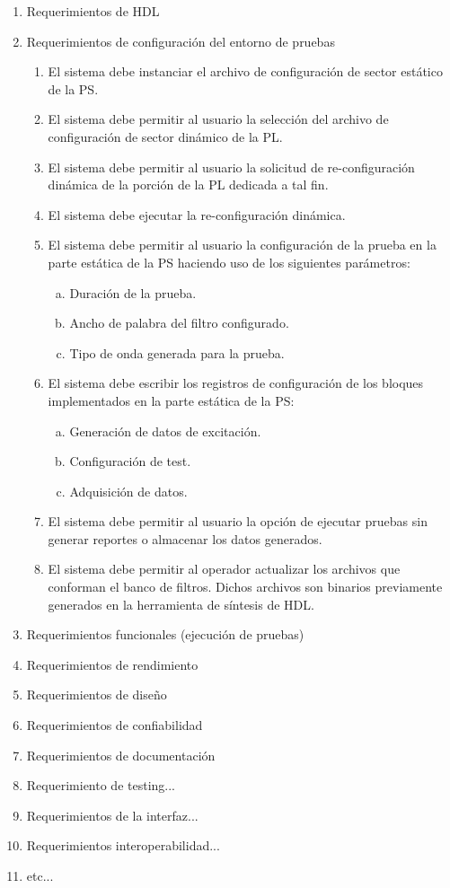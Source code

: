 \documentclass[
11pt, %
]{charter}
\begin{document}
\begin{enumerate}
	\item Requerimientos de HDL
	
	\item Requerimientos de configuración del entorno de pruebas
	\begin{enumerate}
		\item El sistema debe instanciar el archivo de configuración de sector estático de la PS.
		\item El sistema debe permitir al usuario la selección del archivo de configuración de sector dinámico de la PL.
		\item El sistema debe permitir al usuario la solicitud de re-configuración dinámica de la porción de la PL dedicada a tal fin.
		\item El sistema debe ejecutar la re-configuración dinámica.
		\item El sistema debe permitir al usuario la configuración de la prueba en la parte estática de la PS haciendo uso de los siguientes parámetros:
		\begin{enumerate}[a.]
			\item Duración de la prueba.
			\item Ancho de palabra del filtro configurado.
			\item Tipo de onda generada para la prueba.
		\end{enumerate}
		\item El sistema debe escribir los registros de configuración de los bloques implementados en la parte estática de la PS:
		 \begin{enumerate}[a.]
			\item Generación de datos de excitación.
			\item Configuración de test.
			\item Adquisición de datos.
		\end{enumerate}
		\item El sistema debe permitir al usuario la opción de ejecutar pruebas sin generar reportes o almacenar los datos generados. 
		\item El sistema debe permitir al operador actualizar los archivos que conforman el banco de filtros. Dichos archivos son binarios previamente generados en la herramienta de síntesis de HDL.	
	\end{enumerate}
	
	
	\item Requerimientos funcionales (ejecución de pruebas)
	\item Requerimientos de rendimiento
	\item Requerimientos de diseño
	\item Requerimientos de confiabilidad 
	
	\item Requerimientos de documentación
	\item Requerimiento de testing...
	\item Requerimientos de la interfaz...
	\item Requerimientos interoperabilidad...
	\item etc...
\end{enumerate}
\end{document}
